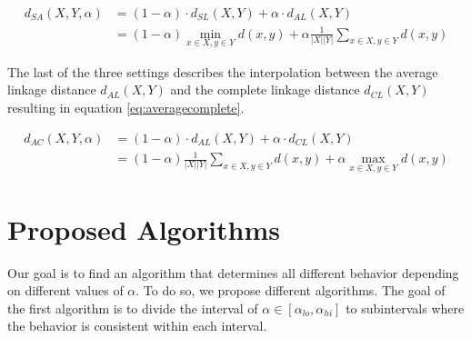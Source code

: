 \begin{equation}
    \begin{aligned}
        d_{SA}(X,Y,\alpha) &= (1 - \alpha) \cdot d_{SL}(X,Y) + \alpha \cdot d_{AL}(X,Y)\\
        &= (1 - \alpha) \min\limits_{x \in X, y \in Y} d(x,y) + \alpha \frac{1}{|X| |Y|}\sum\limits_{x \in X, y \in Y} d(x,y)
    \end{aligned}
    \label{eq:singleaverage}
\end{equation}

The last of the three settings describes the interpolation between the average linkage distance $d_{AL}(X,Y)$ and the complete linkage distance $d_{CL}(X,Y)$ resulting in equation \ref{eq:averagecomplete}.

\begin{equation}
    \begin{aligned}
        d_{AC}(X,Y,\alpha) &= (1 - \alpha) \cdot d_{AL}(X,Y) + \alpha \cdot d_{CL}(X,Y)\\
        &= (1 - \alpha) \frac{1}{|X| |Y|}\sum\limits_{x \in X, y \in Y} d(x,y) + \alpha \max\limits_{x \in X, y \in Y} d(x,y)
    \end{aligned}
    \label{eq:averagecomplete}
\end{equation}


\section{Proposed Algorithms}


Our goal is to find an algorithm that determines all different behavior depending on different values of $\alpha$. To do so, we propose different algorithms. The goal of the first algorithm is to divide the interval of $\alpha \in [\alpha_{lo}, \alpha_{hi}]$ to subintervals where the behavior is consistent within each interval. 

